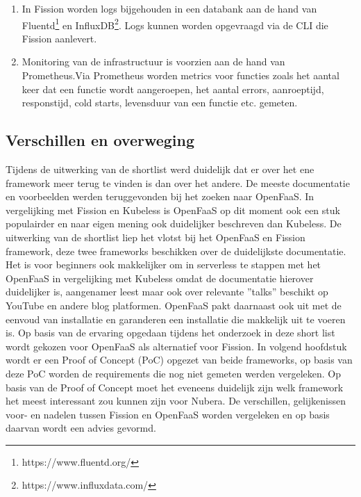 \begin{enumerate}
    \item In Fission worden logs bijgehouden in een databank aan de hand van Fluentd\footnote{https://www.fluentd.org/} en InfluxDB\footnote{https://www.influxdata.com/}. Logs kunnen worden opgevraagd via de CLI die Fission aanlevert.
    \item Monitoring van de infrastructuur is voorzien aan de hand van Prometheus.Via Prometheus worden metrics voor functies zoals het aantal keer dat een functie wordt aangeroepen, het aantal errors, aanroeptijd, responstijd, cold starts, levensduur van een functie etc. gemeten.
\end{enumerate}

\subsection{Verschillen en overweging}

Tijdens de uitwerking van de shortlist werd duidelijk dat er over het ene framework meer terug te vinden is dan over het andere. De meeste documentatie en voorbeelden werden teruggevonden bij het zoeken naar OpenFaaS. In vergelijking met Fission en Kubeless is OpenFaaS op dit moment ook een stuk populairder en naar eigen mening ook duidelijker beschreven dan Kubeless. De uitwerking van de shortlist liep het vlotst bij het OpenFaaS en Fission framework, deze twee frameworks beschikken over de duidelijkste documentatie. Het is voor beginners ook makkelijker om in serverless te stappen met het OpenFaaS in vergelijking met Kubeless omdat de documentatie hierover duidelijker is, aangenamer leest maar ook over relevante ''talks'' beschikt op YouTube en andere blog platformen. OpenFaaS pakt daarnaast ook uit met de eenvoud van installatie en garanderen een installatie die makkelijk uit te voeren is. Op basis van de ervaring opgedaan tijdens het onderzoek in deze short list wordt gekozen voor OpenFaaS als alternatief voor Fission. In volgend hoofdstuk wordt er een Proof of Concept (PoC) opgezet van beide frameworks, op basis van deze PoC worden de requirements die nog niet gemeten werden vergeleken. Op basis van de Proof of Concept moet het eveneens duidelijk zijn welk framework het meest interessant zou kunnen zijn voor Nubera. De verschillen, gelijkenissen voor- en nadelen tussen Fission en OpenFaaS worden vergeleken en op basis daarvan wordt een advies gevormd.